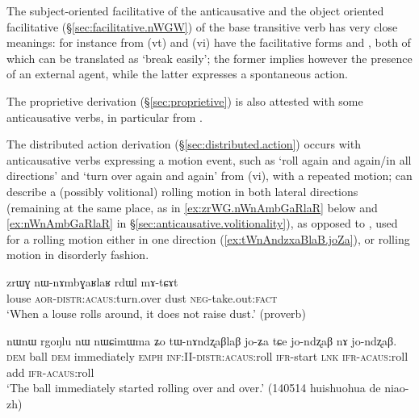The subject-oriented facilitative of the anticausative and the object oriented facilitative   (§\ref{sec:facilitative.nWGW}) of the base transitive verb has very close meanings: for instance from  (vt) and  (vi) have the facilitative forms  and , both of which can be translated as `break easily'; the former implies however the presence of an external agent, while the latter expresses a spontaneous action.

The proprietive  derivation (§\ref{sec:proprietive}) is also attested with some anticausative verbs, in particular  from .

The distributed action derivation (§\ref{sec:distributed.action}) occurs with anticausative verbs expressing a motion event, such as  `roll again and again/in all directions' and  `turn over again and again'  from   (vi), with a repeated motion;  can describe a (possibly volitional) rolling motion in both lateral directions (remaining at the same place, as in \ref{ex:zrWG.nWnAmbGaRlaR} below and \ref{ex:nWnAmbGaRlaR} in §\ref{sec:anticausative.volitionality}), as opposed to , used for a rolling motion either in one direction (\ref{ex:tWnAndzxaBlaB.joZa}), or  rolling motion in disorderly fashion.

\begin{exe}
\ex \label{ex:zrWG.nWnAmbGaRlaR}
\gll  zrɯɣ nɯ-nɤmbɣaʁlaʁ rdɯl mɤ-tɕɤt \\
louse \textsc{aor}-\textsc{distr}:\textsc{acaus}:turn.over dust \textsc{neg}-take.out:\textsc{fact} \\
\glt `When a louse rolls around, it does not raise dust.' (proverb)
\end{exe}

\begin{exe}
\ex \label{ex:tWnAndzxaBlaB.joZa}
\gll nɯnɯ rgoŋlu nɯ nɯɕimɯma ʑo tɯ-nɤndʐaβlaβ jo-ʑa tɕe jo-ndʐaβ nɤ jo-ndʐaβ. \\
\textsc{dem} ball \textsc{dem} immediately \textsc{emph} \textsc{inf}:II-\textsc{distr}:\textsc{acaus}:roll \textsc{ifr}-start \textsc{lnk} \textsc{ifr}-\textsc{acaus}:roll add \textsc{ifr}-\textsc{acaus}:roll \\
\glt `The ball immediately started rolling over and over.' (140514 huishuohua de niao-zh)
\end{exe}


